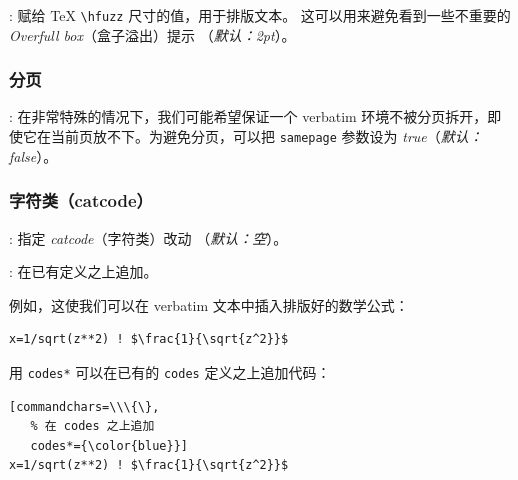\documentclass[twoside]{article}
\newcommand\cs[1]{\texttt{\textbackslash#1}}
\providecommand\optname[1]{\textsf{#1}}
\newenvironment{optlist}{\begin{description}%
  \renewcommand\makelabel[1]{%
    \descriptionlabel{\mdseries\optname{##1}}}%
  \itemsep0.25\itemsep}%
 {\end{description}}
\begin{document}
\begin{optlist}
  \item[hfuzz (dimension)]: 赋给 \TeX{} \cs{hfuzz} 尺寸的值，用于排版文本。
  这可以用来避免看到一些不重要的 \emph{Overfull box}（盒子溢出）提示
  （\emph{默认：2pt}）。
\end{optlist}

\subsubsection{分页}

\begin{optlist}
  \item[samepage (boolean)]: 在非常特殊的情况下，我们可能希望保证一个
  verbatim 环境不被分页拆开，即使它在当前页放不下。为避免分页，可以把
  \texttt{samepage} 参数设为 \emph{true}（\emph{默认：false}）。
\end{optlist}

\subsubsection{字符类（catcode）}

\begin{optlist}
  \item[codes (macro)]: 指定 \emph{catcode}（字符类）改动
  （\emph{默认：空}）。
  \item[codes* (macro)]: 在已有定义之上追加。
\end{optlist}

  例如，这使我们可以在 verbatim 文本中插入排版好的数学公式：

{%
\begin{SideBySideExample}
\begin{Verbatim}[commandchars=\\\{\},
         codes={\catcode`$=3\catcode`^=7}]
    x=1/sqrt(z**2) ! $\frac{1}{\sqrt{z^2}}$
\end{Verbatim}
\end{SideBySideExample}
}  %


用 \verb|codes*| 可以在已有的 \Verb|codes| 定义之上追加代码：

{%
\begin{SideBySideExample}
\begin{Verbatim}[commandchars=\\\{\},
   % 在 codes 之上追加
   codes*={\color{blue}}]
x=1/sqrt(z**2) ! $\frac{1}{\sqrt{z^2}}$
\end{Verbatim}
\end{SideBySideExample}
}  %
\end{document}
